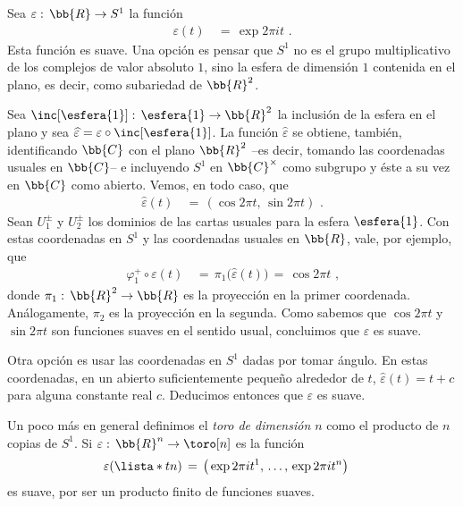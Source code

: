 

\begin{ejemplo}
	Sea $\varepsilon:\,\bb{R}\rightarrow S^{1}$ la funci\'{o}n
	\begin{align*}
		\varepsilon(t) & \,=\,\exp{2\pi i t}
		\text{ .}
	\end{align*}
	Esta funci\'{o}n es suave. Una opci\'{o}n es pensar que $S^{1}$
	no es el grupo multiplicativo de los complejos de valor absoluto
	$1$, sino la esfera de dimensi\'{o}n $1$ contenida en el plano, es
	decir, como subariedad de $\bb{R}^{2}$.
	
	Sea $\inc[\esfera{1}]:\,\esfera{1}\rightarrow\bb{R}^{2}$ la
	inclusi\'{o}n de la esfera en el plano y sea
	$\widehat{\varepsilon}=\varepsilon\circ\inc[\esfera{1}]$.
	La funci\'{o}n $\widehat{\varepsilon}$ se obtiene, tambi\'{e}n,
	identificando $\bb{C}$ con el plano $\bb{R}^{2}$ --es decir, tomando
	las coordenadas usuales en $\bb{C}$-- e incluyendo $S^{1}$ en
	$\bb{C}^{\times}$ como subgrupo y \'{e}ste a su vez en $\bb{C}$ como
	abierto. Vemos, en todo caso, que
	\begin{align*}
		\widehat{\varepsilon}(t) & \,=\,(\cos 2\pi t,\,\sin 2\pi t)
		\text{ .}
	\end{align*}
	Sean $U_{1}^{\pm}$ y $U_{2}^{\pm}$ los dominios de las cartas
	usuales para la esfera $\esfera{1}$. Con estas coordenadas en $S^{1}$
	y las coordenadas usuales en $\bb{R}$, vale, por ejemplo, que
	\begin{align*}
		\varphi_{1}^{+}\circ\varepsilon(t) & \,=\,\pi_{1}\big(
			\widehat{\varepsilon}(t)\big) \,=\,
			\cos 2\pi t
		\text{ ,}
	\end{align*}
	donde $\pi_{1}:\,\bb{R}^{2}\rightarrow\bb{R}$ es la proyecci\'{o}n
	en la primer coordenada. An\'{a}logamente, $\pi_{2}$ es la
	proyecci\'{o}n en la segunda. Como sabemos que $\cos 2\pi t$
	y $\sin 2\pi t$ son funciones suaves en el sentido usual,
	concluimos que $\varepsilon$ es suave.

	Otra opci\'{o}n es usar las coordenadas en $S^{1}$ dadas por tomar
	\'{a}ngulo. En estas coordenadas, en un abierto suficientemente
	peque\~{n}o alrededor de $t$, $\widehat{\varepsilon}(t)=t+c$ para
	alguna constante real $c$. Deducimos entonces que $\varepsilon$ es
	suave.

	Un poco m\'{a}s en general definimos el \emph{toro de dimensi\'{o}n %
	$n$} como el producto de $n$ copias de $S^{1}$. Si
	$\varepsilon:\,\bb{R}^{n}\rightarrow\toro[n]$ es la funci\'{o}n
	\begin{align*}
		\varepsilon(\lista*{t}{n}) & \,=\,
		\big(\exp{2\pi it^{1}},\,\dots,\,\exp{2\pi it^{n}}\big)
	\end{align*}
	es suave, por ser un producto finito de funciones suaves.
\end{ejemplo}

